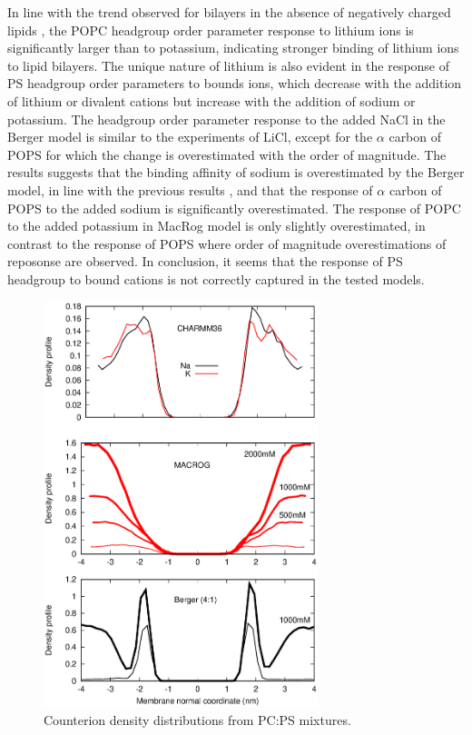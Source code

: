 \documentclass[aps,prl,superscriptaddress,twocolumn]{revtex4}
\begin{document}
In line with the trend observed for bilayers in the absence of negatively
charged lipids \cite{??}, the POPC headgroup order parameter response to lithium ions is
significantly larger than to potassium, indicating stronger binding of lithium
ions to lipid bilayers. The unique nature of lithium is also evident in the
response of PS headgroup order parameters to bounds ions, which decrease
with the addition of lithium or divalent cations but increase with the
addition of sodium or potassium. The headgroup order parameter response
to the added NaCl in the Berger model is similar to the experiments of LiCl,
except for the $\alpha$ carbon of POPS for which the change is overestimated
with the order of magnitude. The results suggests that the binding affinity
of sodium is overestimated by the Berger model, in line with the previous results \cite{catte16},
and that the response of $\alpha$ carbon of POPS to the added sodium
is significantly overestimated. The response of POPC to the added potassium
in MacRog model is only slightly overestimated, in contrast to the response
of POPS where order of magnitude overestimations of reposonse are observed. 
In conclusion, it seems that the response of PS headgroup to bound cations
is not correctly captured in the tested models.

\begin{figure}[]
  \centering
  \includegraphics[width=8.0cm]{../Figs/CIdensPSOCmixt.eps}
  \caption{  Counterion density distributions from PC:PS mixtures.
\label{CIdensPSOCmixt}
  }
\end{figure}
\end{document}
